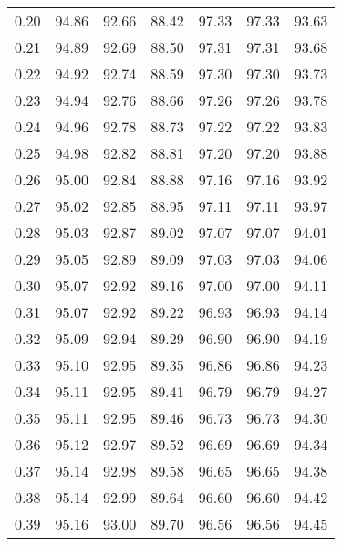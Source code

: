 \begin{tabular}{|c|c|c|c|c|c|c|}
      0.20 &     94.86 &     92.66 &      88.42 &   97.33 &      97.33 &         93.63 \\
      0.21 &     94.89 &     92.69 &      88.50 &   97.31 &      97.31 &         93.68 \\
      0.22 &     94.92 &     92.74 &      88.59 &   97.30 &      97.30 &         93.73 \\
      0.23 &     94.94 &     92.76 &      88.66 &   97.26 &      97.26 &         93.78 \\
      0.24 &     94.96 &     92.78 &      88.73 &   97.22 &      97.22 &         93.83 \\
      0.25 &     94.98 &     92.82 &      88.81 &   97.20 &      97.20 &         93.88 \\
      0.26 &     95.00 &     92.84 &      88.88 &   97.16 &      97.16 &         93.92 \\
      0.27 &     95.02 &     92.85 &      88.95 &   97.11 &      97.11 &         93.97 \\
      0.28 &     95.03 &     92.87 &      89.02 &   97.07 &      97.07 &         94.01 \\
      0.29 &     95.05 &     92.89 &      89.09 &   97.03 &      97.03 &         94.06 \\
      0.30 &     95.07 &     92.92 &      89.16 &   97.00 &      97.00 &         94.11 \\
      0.31 &     95.07 &     92.92 &      89.22 &   96.93 &      96.93 &         94.14 \\
      0.32 &     95.09 &     92.94 &      89.29 &   96.90 &      96.90 &         94.19 \\
      0.33 &     95.10 &     92.95 &      89.35 &   96.86 &      96.86 &         94.23 \\
      0.34 &     95.11 &     92.95 &      89.41 &   96.79 &      96.79 &         94.27 \\
      0.35 &     95.11 &     92.95 &      89.46 &   96.73 &      96.73 &         94.30 \\
      0.36 &     95.12 &     92.97 &      89.52 &   96.69 &      96.69 &         94.34 \\
      0.37 &     95.14 &     92.98 &      89.58 &   96.65 &      96.65 &         94.38 \\
      0.38 &     95.14 &     92.99 &      89.64 &   96.60 &      96.60 &         94.42 \\
      0.39 &     95.16 &     93.00 &      89.70 &   96.56 &      96.56 &         94.45 \\

\end{tabular}
